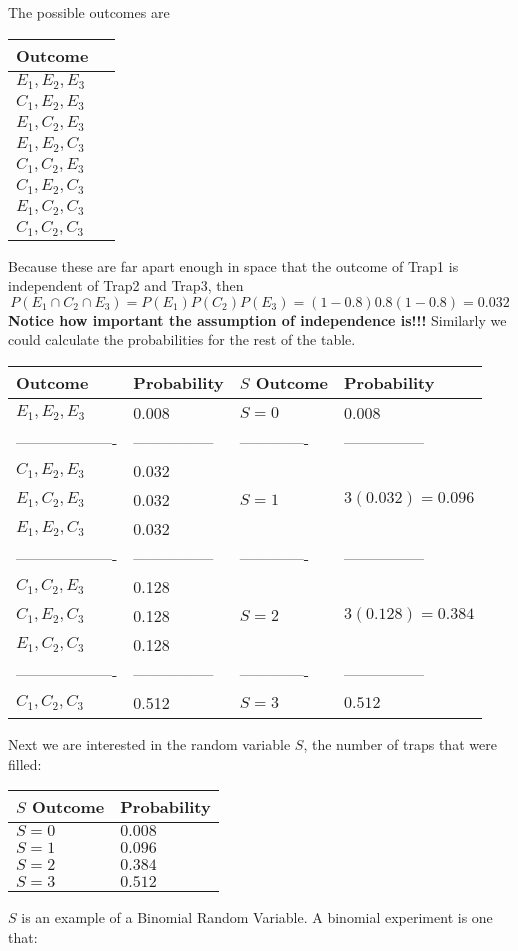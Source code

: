 \documentclass[]{book}
\begin{document}
The possible outcomes are

\begin{longtable}[]{@{}ll@{}}
\toprule
Outcome & \(\,\)\tabularnewline
\midrule
\endhead
\(E_1, E_2, E_3\) & \(\,\)\tabularnewline
\(C_1, E_2, E_3\) & \(\,\)\tabularnewline
\(E_1, C_2, E_3\) & \(\,\)\tabularnewline
\(E_1, E_2, C_3\) & \(\,\)\tabularnewline
\(C_1, C_2, E_3\) & \(\,\)\tabularnewline
\(C_1, E_2, C_3\) & \(\,\)\tabularnewline
\(E_1, C_2, C_3\) & \(\,\)\tabularnewline
\(C_1, C_2, C_3\) & \(\,\)\tabularnewline
\bottomrule
\end{longtable}

Because these are far apart enough in space that the outcome of Trap1 is
independent of Trap2 and Trap3, then
\[P(E_{1}\cap C_{2}\cap E_{3})  =   P(E_{1})P(C_{2})P(E_{3})
    =   (1-0.8)0.8(1-0.8)
    =   0.032\] \textbf{Notice how important the assumption of
independence is!!!} Similarly we could calculate the probabilities for
the rest of the table.

\begin{longtable}[]{@{}llll@{}}
\toprule
Outcome & Probability & \(S\) Outcome & Probability\tabularnewline
\midrule
\endhead
\(E_1, E_2, E_3\) & 0.008 & \(S=0\) & 0.008\tabularnewline
------------------- & --------------- & ------------- &
---------------\tabularnewline
\(C_1, E_2, E_3\) & 0.032 & &\tabularnewline
\(E_1, C_2, E_3\) & 0.032 & \(S=1\) &
\(3(0.032) = 0.096\)\tabularnewline
\(E_1, E_2, C_3\) & 0.032 & &\tabularnewline
------------------- & --------------- & ------------- &
---------------\tabularnewline
\(C_1, C_2, E_3\) & 0.128 & &\tabularnewline
\(C_1, E_2, C_3\) & 0.128 & \(S=2\) &
\(3(0.128) = 0.384\)\tabularnewline
\(E_1, C_2, C_3\) & 0.128 & &\tabularnewline
------------------- & --------------- & ------------- &
---------------\tabularnewline
\(C_1, C_2, C_3\) & 0.512 & \(S=3\) & \(0.512\)\tabularnewline
\bottomrule
\end{longtable}

Next we are interested in the random variable \(S\), the number of traps
that were filled:

\begin{longtable}[]{@{}ll@{}}
\toprule
\(S\) Outcome & Probability\tabularnewline
\midrule
\endhead
\(S=0\) & \(0.008\)\tabularnewline
\(S=1\) & \(0.096\)\tabularnewline
\(S=2\) & \(0.384\)\tabularnewline
\(S=3\) & \(0.512\)\tabularnewline
\bottomrule
\end{longtable}

\(S\) is an example of a Binomial Random Variable. A binomial experiment
is one that:
\end{document}

